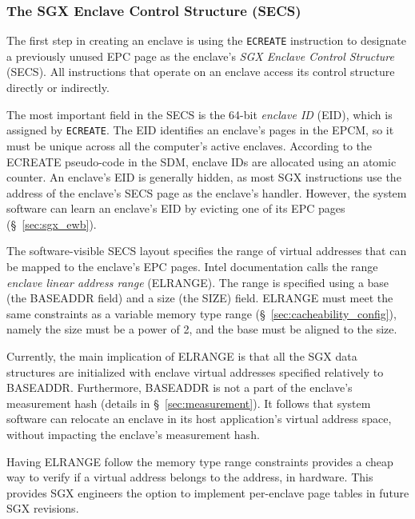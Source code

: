 \subsubsection{The SGX Enclave Control Structure (SECS)}
\label{sec:secs}


The first step in creating an enclave is using the \texttt{ECREATE} instruction
to designate a previously unused EPC page as the enclave's \textit{SGX Enclave
Control Structure} (SECS). All instructions that operate on an enclave access
its control structure directly or indirectly.


The most important field in the SECS is the 64-bit \textit{enclave ID} (EID),
which is assigned by \texttt{ECREATE}. The EID identifies an enclave's pages in
the EPCM, so it must be unique across all the computer's active enclaves.
According to the ECREATE pseudo-code in the SDM, enclave IDs are allocated
using an atomic counter. An enclave's EID is generally hidden, as most SGX
instructions use the address of the enclave's SECS page as the enclave's
handler. However, the system software can learn an enclave's EID by evicting
one of its EPC pages (\S~\ref{sec:sgx_ewb}).

The software-visible SECS layout specifies the range of virtual addresses that
can be mapped to the enclave's EPC pages. Intel documentation calls the range
\textit{enclave linear address range} (ELRANGE). The range is specified using a
base (the BASEADDR field) and a size (the SIZE) field. ELRANGE must meet the
same constraints as a variable memory type range
(\S~\ref{sec:cacheability_config}), namely the size must be a power of 2, and
the base must be aligned to the size.

Currently, the main implication of ELRANGE is that all the SGX data structures
are initialized with enclave virtual addresses specified relatively to
BASEADDR. Furthermore, BASEADDR is not a part of the enclave's measurement
hash (details in \S~\ref{sec:measurement}). It follows that system software can
relocate an enclave in its host application's virtual address space, without
impacting the enclave's measurement hash.

Having ELRANGE follow the memory type range constraints provides a cheap way to
verify if a virtual address belongs to the address, in hardware. This provides
SGX engineers the option to implement per-enclave page tables in future SGX
revisions.

